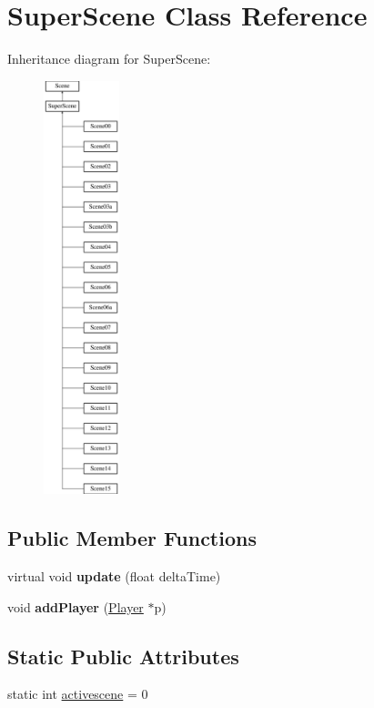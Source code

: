 \hypertarget{class_super_scene}{}\section{Super\+Scene Class Reference}
\label{class_super_scene}
Inheritance diagram for Super\+Scene\+:\begin{figure}[H]
\begin{center}
\leavevmode
\includegraphics[height=12.000000cm]{class_super_scene}
\end{center}
\end{figure}
\subsection*{Public Member Functions}
\begin{DoxyCompactItemize}
\item 
\mbox{\label{class_super_scene_a15f01dff85c3fd9933877b06b209c7ee}} 
virtual void {\bfseries update} (float delta\+Time)
\item 
\mbox{\label{class_super_scene_aa61d58308c7849a0a060c71cdbb6fac0}} 
void {\bfseries add\+Player} (\hyperlink{struct_player}{Player} $\ast$p)
\end{DoxyCompactItemize}
\subsection*{Static Public Attributes}
\begin{DoxyCompactItemize}
\item 
static int \hyperlink{class_super_scene_af98d73650372f31f17f19c02fde6f9be}{activescene} = 0
\end{DoxyCompactItemize}
